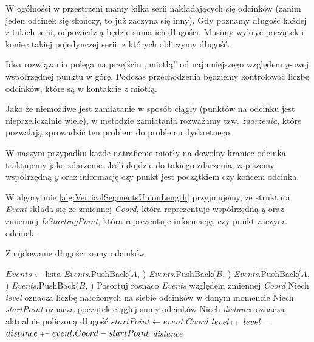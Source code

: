 W ogólności w przestrzeni mamy kilka serii
nakładających się odcinków (zanim jeden odcinek się skończy, to już zaczyna się inny). Gdy poznamy długość każdej
z takich serii, odpowiedzią będzie suma ich długości. Musimy wykryć początek i koniec takiej pojedynczej serii, 
z których obliczymy długość.

Idea rozwiązania polega na przejściu ,,miotłą'' od najmniejszego względem 
$y$-owej współrzędnej punktu w górę. Podczas przechodzenia
będziemy kontrolować liczbę odcinków, które są w kontakcie z miotłą.

Jako że niemożliwe jest zamiatanie w sposób ciągły (punktów na odcinku 
jest nieprzeliczalnie wiele), w metodzie zamiatania rozważamy 
tzw. \textit{zdarzenia}, które pozwalają sprowadzić ten problem 
do problemu dyskretnego.

W naszym przypadku każde natrafienie miotły na dowolny kraniec odcinka
traktujemy jako zdarzenie. Jeśli dojdzie do takiego zdarzenia,
zapiszemy współrzędną $y$ oraz informację czy punkt jest początkiem czy końcem odcinka.

W algorytmie \ref{alg:VerticalSegmentsUnionLength} przyjmujemy, że
struktura \textit{Event} składa się ze zmiennej \textit{Coord}, która reprezentuje
współrzędną $y$ oraz zmiennej \textit{IsStartingPoint}, która 
reprezentuje informację, czy punkt zaczyna odcinek.

\begin{algorithm}[H]
	\caption{Znajdowanie długości sumy odcinków}
	\begin{algorithmic}[1]
		\State $Events \gets \text{lista}$
				\State \textit{Events}.PushBack($A$, \true)
				\State \textit{Events}.PushBack($B$, \false)
			\Else
				\State \textit{Events}.PushBack($A$, \false)
				\State \textit{Events}.PushBack($B$, \true)
			\EndIf
		\EndFor
		\State Posortuj rosnąco \textit{Events} względem zmiennej \textit{Coord}
		\State Niech \textit{level} oznacza liczbę nałożonych na siebie odcinków w danym momencie
		\State Niech \textit{startPoint} oznacza początek ciągłej sumy odcinków
		\State Niech \textit{distance} oznacza aktualnie policzoną długość
					\State $startPoint \gets event.Coord$
				\EndIf
				\State $level\pp$
			\Else 
				\State $level\mm$
					\State $distance \pleq event.Coord - startPoint$
				\EndIf
			\EndIf
		\EndFor
		\State \Return \textit{distance}
		\EndProcedure
	\end{algorithmic}
	\label{alg:VerticalSegmentsUnionLength}
\end{algorithm}

